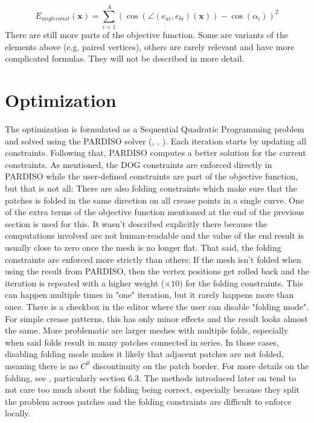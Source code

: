 \documentclass[a4paper,twoside,12pt,nochapterprefix]{scrbook}
\begin{document}
\begin{equation}
E_{angleconst}(\mathbf{x}) = \sum_{i = 1}^A (\cos( \angle(e_{ai}, e_{bi})(\mathbf{x})) - \cos(\alpha_i ))^2
\end{equation}
There are still more parts of the objective function. Some are variants of the elements above (e.g. paired vertices), others are rarely relevant and have more complicated formulas. They will not be described in more detail.\newline
\section{Optimization}
The optimization is formulated as a Sequential Quadratic Programming problem and solved using the PARDISO solver (\cite{pardiso-6.0a}, \cite{pardiso-6.0b}, \cite{pardiso-6.0c}). Each iteration starts by updating all constraints. Following that, PARDISO computes a better solution for the current constraints. As mentioned, the DOG constraints are enforced directly in PARDISO while the user-defined constraints are part of the objective function, but that is not all:\newline
There are also folding constraints which make sure that the patches is folded in the same direction on all crease points in a single curve. One of the extra terms of the objective function mentioned at the end of the previous section is used for this. It wasn't described explicitly there because the computations involved are not human-readable and the value of the end result is usually close to zero once the mesh is no longer flat.\newline
That said, the folding constraints are enforced more strictly than others: If the mesh isn't folded when using the result from PARDISO, then the vertex positions get rolled back and the iteration is repeated with a higher weight ($\times 10$) for the folding constraints. This can happen multiple times in "one" iteration, but it rarely happens more than once.\newline
There is a checkbox in the editor where the user can disable "folding mode". For simple crease patterns, this has only minor effects and the result looks almost the same. More problematic are larger meshes with multiple folds, especially when said folds result in many patches connected in series. In those cases, disabling folding mode makes it likely that adjacent patches are not folded, meaning there is no $C^0$ discontinuity on the patch border.\newline
For more details on the folding, see \cite{Rabinovich:CurvedFolds:2019}, particularly section 6.3. The methods introduced later on tend to not care too much about the folding being correct, especially because they split the problem across patches and the folding constraints are difficult to enforce locally.\newline
\end{document}
